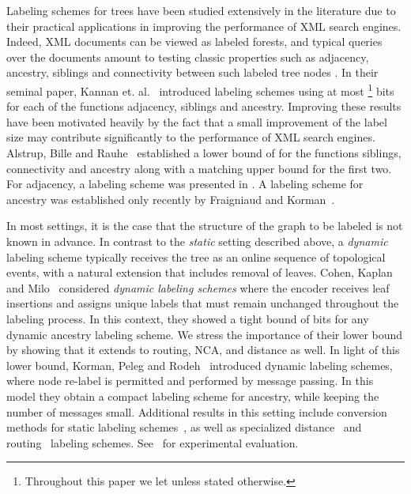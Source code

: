 \documentclass{llncs}
\newcommand{\sd}[1]{{#1}}
\newcommand{\drop}[1]{}
\begin{document}
Labeling schemes for trees have been studied extensively in the literature due
to their practical applications in improving the performance of XML search
engines. Indeed, XML documents can be viewed as labeled forests, and typical
queries over the documents amount to testing classic properties such as
adjacency, ancestry, siblings and connectivity  between such labeled tree nodes
\cite{wu2004prime}. In their seminal paper, Kannan et. al.~\cite{Kannan92}
introduced labeling schemes using at most  \footnote{Throughout this
paper we let  unless stated otherwise.} bits
for each of the functions adjacency, siblings  and ancestry. Improving
these results have been motivated heavily by the fact that a small improvement
of the label size may contribute significantly to the performance of XML search
engines. Alstrup, Bille and Rauhe~\cite{Alstrup05} established a lower bound of
 for the functions siblings, connectivity and ancestry
along with a matching upper bound for the first two. \sd{For adjacency, a  labeling scheme was presented in \cite{Alstrup02}.} A   labeling scheme for ancestry was established only recently by
Fraigniaud and Korman~\cite{Korman10}.

In most settings, it is the case that the \sd{structure of the graph to be
labeled}\drop{data structure} is not known in advance.
In contrast to the \emph{static} setting described above, a \emph{dynamic}
labeling scheme typically receives the tree as an online sequence of
\sd{topological events}\drop{addition of leaves}, with a natural extension
that includes  removal of
leaves. Cohen, Kaplan and Milo~\cite{cohen2010labeling} considered
\emph{dynamic labeling schemes} where the  encoder receives   leaf
insertions and assigns unique   labels that must remain unchanged throughout
the labeling process. In this context, they showed  a tight bound of
 bits for any dynamic ancestry labeling scheme\drop{\footnote{From
hereon, the lower bound  is referred as Cohen's  bound.}}. We stress the
importance of their lower bound by showing that it extends to  routing, NCA,
and distance as well. In light of this lower bound, Korman, Peleg and
Rodeh~\cite{korman2004labeling} introduced  dynamic labeling schemes, where
node re-label is permitted and performed by message passing. In this model they
obtain a compact labeling scheme for ancestry, while keeping the number of
messages small. Additional results in this setting include conversion methods
for static labeling schemes~\cite{korman2004labeling,korman2007general}, as
well as specialized distance~\cite{korman2007general,korman2007labeling} and
routing~\cite{korman2008improved,korman2009compact} labeling schemes.
See~\cite{Rotbart14} for experimental evaluation.
\end{document}
